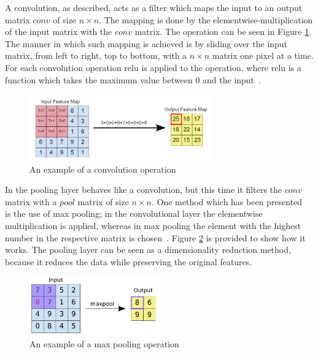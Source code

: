 A convolution, as described, acts as a filter which maps the input to an output matrix $conv$ of size $n \times n$. The mapping is done by the elementwise-multiplication of the input matrix with the $conv$ matrix. The operation can be seen in Figure \ref{fig:convolution}. The manner in which such mapping is achieved is by sliding over the input matrix, from left to right, top to bottom, with a $n \times n$ matrix one pixel at a time. For each convolution operation \gls{relu} is applied to the operation, where \gls{relu} is a function which takes the maximum value between 0 and the input~\cite{google-cnn}.

\begin{figure}[htb!]
    \centering
    \includegraphics[width=0.7\textwidth]{figures/google-cnn-convolution-example.png}
    \caption{An example of a convolution operation~\cite{google-cnn}}
    \label{fig:convolution}
\end{figure}

In the pooling layer behaves like a convolution, but this time it filters the $conv$ matrix with a $pool$ matrix of size $n \times n$. One method which has been presented~\cite{google-cnn} is the use of max pooling; in the convolutional layer the elementwise multiplication is applied, whereas in max pooling the element with the highest number in the respective matrix is chosen~\cite{google-cnn}. Figure \ref{fig:maxpooling} is provided to show how it works. The pooling layer can be seen as a dimensionality reduction method, because it reduces the data while preserving the original features.

\begin{figure}[htb!]
    \centering
    \includegraphics[width=0.5\textwidth]{figures/google-cnn-maxpooling-example.png}
    \caption{An example of a max pooling operation~\cite{google-cnn}}
    \label{fig:maxpooling}
\end{figure}

